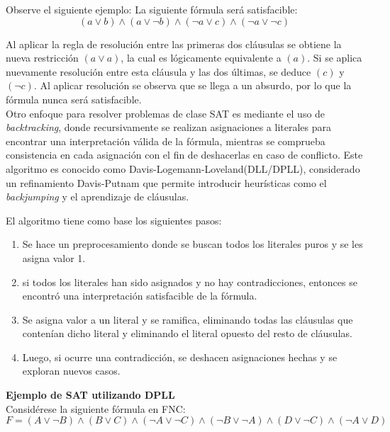\documentclass[12pt]{report}
\begin{document}
Observe el siguiente ejemplo: La siguiente fórmula será satisfacible:
$$(a\lor  b) \land(a\lor  \neg b) \land (\neg a\lor  c) \land(\neg a\lor  \neg c)$$

Al aplicar la regla de resolución entre las primeras dos cláusulas se obtiene la nueva restricción $(a \lor  a)$, la cual es lógicamente equivalente a $(a)$. Si se aplica nuevamente resolución entre esta cláusula y las dos últimas, se deduce $(c)$ y $(\neg c)$. Al aplicar resolución se observa que se llega a un absurdo, por lo que la fórmula nunca será satisfacible. \\

Otro enfoque para resolver problemas de clase SAT es mediante el uso de \textit{backtracking}, donde recursivamente se realizan asignaciones a literales para encontrar una interpretación válida de la fórmula, mientras se comprueba consistencia en cada asignación con el fin de deshacerlas en caso de conflicto. Este algoritmo es conocido como Davis-Logemann-Loveland(DLL/DPLL), considerado un refinamiento Davis-Putnam que permite introducir heurísticas como el \textit{backjumping} y el aprendizaje de cláusulas.

El algoritmo tiene como base los siguientes pasos:
\begin{enumerate}
    \item Se hace un preprocesamiento donde se buscan todos los literales puros y se les asigna valor 1.
    \item si todos los literales han sido asignados y no hay contradicciones, entonces se encontró una interpretación satisfacible de la fórmula.
    \item Se asigna valor a un literal y se ramifica, eliminando todas las cláusulas que contenían dicho literal y eliminando el literal opuesto del resto de cláusulas.
    \item Luego, si ocurre una contradicción, se deshacen asignaciones hechas y se exploran nuevos casos.\\
\end{enumerate}
 
\textbf{Ejemplo de SAT utilizando DPLL}\\

Considérese la siguiente fórmula en FNC:
$F=(A\lor \neg B)\land(B\lor C)\land(\neg A\lor \neg C)\land(\neg B\lor \neg A)\land(D\lor \neg C)\land(\neg A\lor D)$\\
\end{document}
